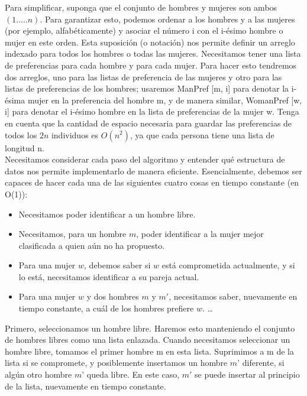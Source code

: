 \documentclass[a4paper]{article}
\begin{document}
Para simplificar, suponga que el conjunto de hombres y mujeres son ambos $(1 ..... n)$. Para garantizar esto, podemos ordenar a los hombres y a las mujeres (por ejemplo, alfabéticamente) y asociar el número i con el i-ésimo hombre o mujer en este orden. Esta suposición (o notación) nos permite definir un arreglo indexado para todos los hombres o todas las mujeres. Necesitamos tener una lista de preferencias para cada hombre y para cada mujer. Para hacer esto tendremos dos arreglos, uno para las listas de preferencia de las mujeres y otro para las listas de preferencias de los hombres; usaremos ManPref [m, i] para denotar la i-ésima mujer en la preferencia del hombre m, y de manera similar, WomanPref [w, i] para denotar el i-ésimo hombre en la lista de preferencias de la mujer w. Tenga en cuenta que la cantidad de espacio necesaria para guardar las preferencias de todos los $2n$
individuos es $O(n^2)$, ya que cada persona tiene una lista de longitud n.\\

Necesitamos considerar cada paso del algoritmo y entender qué estructura de datos nos permite implementarlo de manera eficiente. Esencialmente, debemos ser capaces de hacer cada una de las siguientes cuatro cosas en tiempo constante (en O(1)):


\begin{itemize}
 \item Necesitamos poder identificar a un hombre libre. 
 
 \item Necesitamos, para un hombre $m$, poder identificar a la mujer mejor clasificada a quien aún no ha propuesto.
 
 \item Para una mujer $w$, debemos saber si $w$ está comprometida actualmente, y si lo está, necesitamos identificar a su pareja actual.
 
 \item Para una mujer $w$ y dos hombres $m$ y $m'$, necesitamos saber, nuevamente en tiempo constante, a cuál de los hombres prefiere $w$. \ldots 
\end{itemize}

 

Primero, seleccionamos un hombre libre. Haremos esto manteniendo el conjunto de hombres libres como una lista enlazada. Cuando necesitamos seleccionar un hombre libre, tomamos el primer hombre m en esta lista. Suprimimos a m de la lista si se compromete, y posiblemente insertamos un hombre $m’$ diferente, si algún otro hombre $m’$ queda libre. En este caso, $m'$ se puede insertar al principio de la lista, nuevamente en tiempo constante.\\
\end{document}
